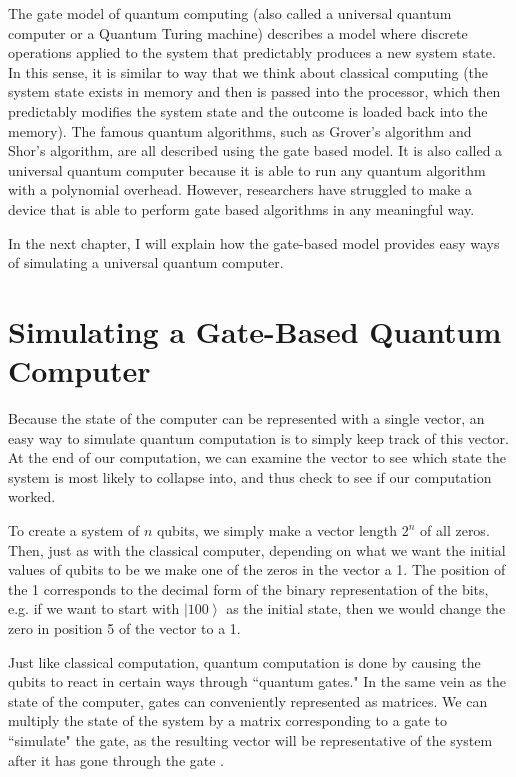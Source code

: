 \documentclass[11pt]{report}
\newcommand{\?}{\stackrel{?}{=}}
\begin{document}
The gate model of quantum computing (also called a universal quantum computer or a Quantum Turing machine) describes a model where discrete operations applied to the system that predictably produces a new system state. In this sense, it is similar to way that we think about classical computing (the system state exists in memory and then is passed into the processor, which then predictably modifies the system state and the outcome is loaded back into the memory). The famous quantum algorithms, such as Grover's algorithm and Shor's algorithm, are all described using the gate based model. It is also called a universal quantum computer because it is able to run any quantum algorithm with a polynomial overhead. However, researchers have struggled to make a device that is able to perform gate based algorithms in any meaningful way.

In the next chapter, I will explain how the gate-based model provides easy ways of simulating a universal quantum computer.

\chapter{Simulating a Gate-Based Quantum Computer}

Because the state of the computer can be represented with a single vector, an easy way to simulate quantum computation is to simply keep track of this vector. At the end of our computation, we can examine the vector to see which state the system is most likely to collapse into, and thus check to see if our computation worked.

To create a system of $n$ qubits, we simply make a vector length $2^{n}$ of all zeros. Then, just as with the classical computer, depending on what we want the initial values of qubits to be we make one of the zeros in the vector a 1. The position of the 1 corresponds to the decimal form of the binary representation of the bits, e.g. if we want to start with $\left | 100 \right \rangle$ as the initial state, then we would change the zero in position 5 of the vector to a 1.

Just like classical computation, quantum computation is done by causing the qubits to react in certain ways through ``quantum gates." In the same vein as the state of the computer, gates can conveniently represented as matrices. We can multiply the state of the system by a matrix corresponding to a gate to ``simulate" the gate, as the resulting vector will be representative of the system after it has gone through the gate \cite{spector04}.
\end{document}
